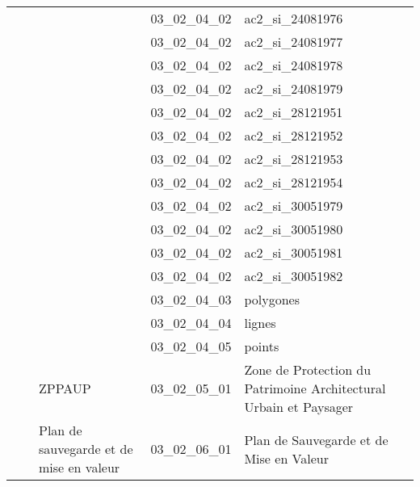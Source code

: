\documentclass[12pt,titlepage,oneside]{book}
\begin{document}
\begin{supertabular}{|p{7.5cm}|p{7.5cm}|p{7.5cm}|c|p{10cm}|}
                   &                    &                    & 03\_02\_04\_02 & ac2\_si\_24081976\\
                   &                    &                    & 03\_02\_04\_02 & ac2\_si\_24081977\\
                   &                    &                    & 03\_02\_04\_02 & ac2\_si\_24081978\\
                   &                    &                    & 03\_02\_04\_02 & ac2\_si\_24081979\\
                   &                    &                    & 03\_02\_04\_02 & ac2\_si\_28121951\\
                   &                    &                    & 03\_02\_04\_02 & ac2\_si\_28121952\\
                   &                    &                    & 03\_02\_04\_02 & ac2\_si\_28121953\\
                   &                    &                    & 03\_02\_04\_02 & ac2\_si\_28121954\\
                   &                    &                    & 03\_02\_04\_02 & ac2\_si\_30051979\\
                   &                    &                    & 03\_02\_04\_02 & ac2\_si\_30051980\\
                   &                    &                    & 03\_02\_04\_02 & ac2\_si\_30051981\\
                   &                    &                    & 03\_02\_04\_02 & ac2\_si\_30051982\\
                   &                    &                    & 03\_02\_04\_03 & polygones\\
                   &                    &                    & 03\_02\_04\_04 & lignes\\
                   &                    &                    & 03\_02\_04\_05 & points\\
                   &                    & ZPPAUP & 03\_02\_05\_01 & Zone de Protection du Patrimoine Architectural Urbain et Paysager\\
                   &                    & Plan de sauvegarde et de mise en valeur & 03\_02\_06\_01 & Plan de Sauvegarde et de Mise en Valeur\\

\end{supertabular}
\end{document}
